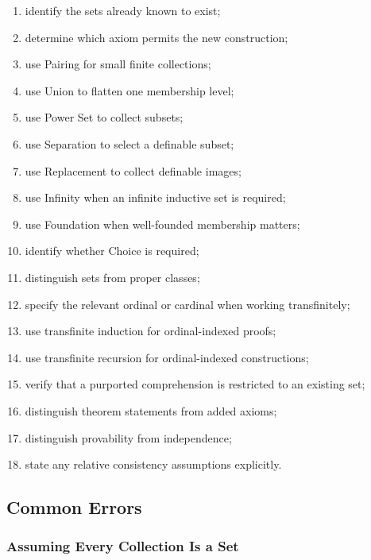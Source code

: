 \begin{enumerate}
    \item identify the sets already known to exist;
    \item determine which axiom permits the new construction;
    \item use Pairing for small finite collections;
    \item use Union to flatten one membership level;
    \item use Power Set to collect subsets;
    \item use Separation to select a definable subset;
    \item use Replacement to collect definable images;
    \item use Infinity when an infinite inductive set is required;
    \item use Foundation when well-founded membership matters;
    \item identify whether Choice is required;
    \item distinguish sets from proper classes;
    \item specify the relevant ordinal or cardinal when working
          transfinitely;
    \item use transfinite induction for ordinal-indexed proofs;
    \item use transfinite recursion for ordinal-indexed constructions;
    \item verify that a purported comprehension is restricted to an
          existing set;
    \item distinguish theorem statements from added axioms;
    \item distinguish provability from independence;
    \item state any relative consistency assumptions explicitly.
\end{enumerate}

\subsection{Common Errors}
\label{subsec:axiomatic-set-theory-common-errors}

\subsubsection{Assuming Every Collection Is a Set}


